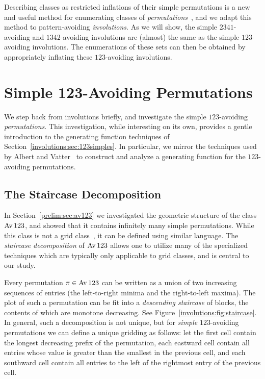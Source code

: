     Describing classes as restricted inflations of their simple permutations is
    a new and useful method for enumerating classes of
    \emph{permutations}~\cite{Albert2012}, and we adapt this method to pattern-avoiding
    \emph{involutions}. As we will show, the simple $2341$-avoiding and
    $1342$-avoiding involutions are (almost) the same as the simple
    $123$-avoiding involutions. The enumerations of these sets can then be
    obtained by appropriately inflating these $123$-avoiding involutions. 

    




\section{Simple 123-Avoiding Permutations}
\label{involutions:sec:perms}

  We step back from involutions briefly, and investigate the simple
  $123$-avoiding \emph{permutations}. This investigation, while interesting on
  its own, provides a gentle introduction to the generating function techniques
  of Section~\ref{involutions:sec:123simples}. In particular, we mirror the
  techniques used by Albert and Vatter~\cite{Vatter2013} to construct and
  analyze a generating function for the $123$-avoiding permutations. 

  \subsection{The Staircase Decomposition}
    
    In Section~\ref{prelim:sec:av123} we investigated the geometric
    structure of the class $\operatorname{{Av}} 123$, and showed that it contains infinitely
    many simple permutations. While this class is not a grid
    class~\cite{GridClasses}, it can be defined using similar language. The
    \emph{staircase decomposition} of $\operatorname{{Av}} 123$ allows one to utilize many of
    the specialized techniques which are typically only applicable to grid
    classes, and is central to our study.  

    Every permutation $\pi \in \operatorname{{Av}} 123$ can be written as a union of two
    increasing sequences of entries (the left-to-right minima and the
    right-to-left maxima). The plot of such a permutation can be fit into a
    \emph{descending staircase} of blocks, the contents of which are monotone
    decreasing. See Figure~\ref{involutions:fig:staircase}. In general, such a
    decomposition is not unique, but for \emph{simple} $123$-avoiding
    permutations we can define a unique gridding as follows: let the first cell
    contain the longest decreasing prefix of the permutation, each eastward
    cell contain all entries whose value is greater than the smallest in the
    previous cell, and each southward cell contain all entries to the left of
    the rightmost entry of the previous cell. 
  
